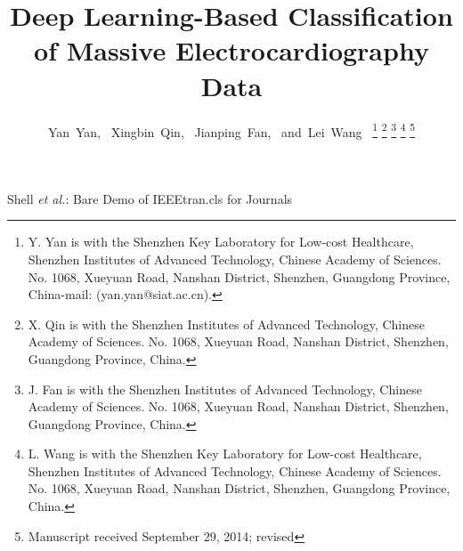 \documentclass[journal]{IEEEtran}
\begin{document}
%
\title{Deep Learning-Based Classification of Massive Electrocardiography Data}
%
%
%

\author{Yan~Yan,~
        Xingbin~Qin,~
        Jianping~Fan,~
        and~Lei~Wang~%
\thanks{Y. Yan is with the Shenzhen Key Laboratory for Low-cost Healthcare, Shenzhen Institutes of Advanced Technology, Chinese Academy of Sciences. No. 1068, Xueyuan Road, Nanshan District,
Shenzhen, Guangdong Province, China-mail: (yan.yan@siat.ac.cn).}%
\thanks{X. Qin is with the Shenzhen Institutes of Advanced Technology, Chinese Academy of Sciences.
No. 1068, Xueyuan Road, Nanshan District, Shenzhen, Guangdong Province, China.}%
\thanks{J. Fan is with the Shenzhen Institutes of Advanced Technology, Chinese Academy of Sciences. No. 1068, Xueyuan Road, Nanshan District, Shenzhen, Guangdong Province, China.}%
\thanks{L. Wang is with the Shenzhen Key Laboratory for Low-cost Healthcare, Shenzhen Institutes of Advanced Technology, Chinese Academy of Sciences.
No. 1068, Xueyuan Road, Nanshan District,
Shenzhen, Guangdong Province, China.}%
\thanks{Manuscript received September 29, 2014; revised}}


%
{Shell \MakeLowercase{\textit{et al.}}: Bare Demo of IEEEtran.cls for Journals}


\maketitle
\end{document}
